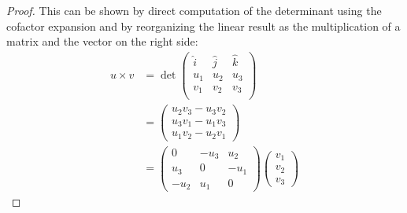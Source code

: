 \documentclass[12pt, letterpaper, onecolumn, conference, final]{IEEEtran}
\theoremstyle{definition}
\newtheorem{proposition}{Proposition}
\theoremstyle{plain}
\begin{document}
\begin{proof}
This can be shown by direct computation of the determinant using the cofactor expansion and by reorganizing the linear result as the multiplication of a matrix and the vector on the right side:
\begin{equation*}
\begin{split}
u \times v &= \det\begin{pmatrix}
\hat{i} & \hat{j} & \hat{k} \\
u_1 & u_2 & u_3 \\
v_1 & v_2 & v_3 \\
\end{pmatrix} \\
&= \begin{pmatrix}
u_2v_3 - u_3v_2 \\
u_3v_1 - u_1v_3 \\
u_1v_2 - u_2v_1
\end{pmatrix} \\
&= \begin{pmatrix}
0 & -u_3 & u_2 \\
u_3 & 0 & -u_1 \\
-u_2 & u_1 & 0
\end{pmatrix} \begin{pmatrix}
v_1 \\
v_2 \\
v_3
\end{pmatrix}
\end{split}
\end{equation*}
\end{proof}

\begin{center}
\end{center}
\end{document}
